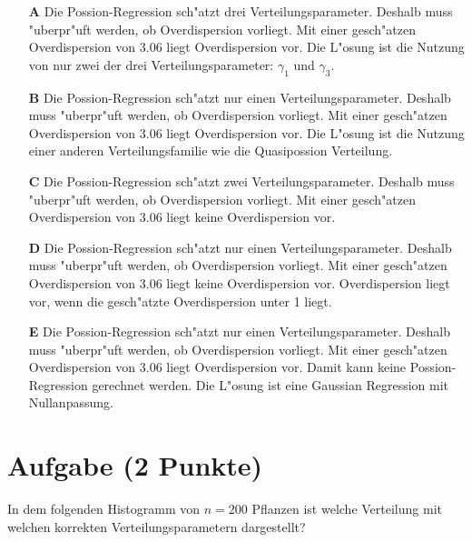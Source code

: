 \documentclass[a4paper, 10pt]{scrartcl}\usepackage[]{graphicx}\usepackage[]{color}
\begin{document}
\begin{enumerate}
\item [\textbf{A} \msquare] Die Possion-Regression sch{"a}tzt drei Verteilungsparameter. Deshalb muss {"u}berpr{"u}ft werden, ob Overdispersion vorliegt. Mit einer gesch{"a}tzen Overdispersion von 3.06 liegt Overdispersion vor. Die L{"o}sung ist die Nutzung von nur zwei der drei Verteilungsparameter: $\gamma_1$ und $\gamma_3$.
\item [\textbf{B} \msquare] Die Possion-Regression sch{"a}tzt nur einen Verteilungsparameter. Deshalb muss {"u}berpr{"u}ft werden, ob Overdispersion vorliegt. Mit einer gesch{"a}tzen Overdispersion von 3.06 liegt Overdispersion vor. Die L{"o}sung ist die Nutzung einer anderen Verteilungsfamilie wie die Quasipossion Verteilung.
\item [\textbf{C} \msquare] Die Possion-Regression sch{"a}tzt zwei Verteilungsparameter. Deshalb muss {"u}berpr{"u}ft werden, ob Overdispersion vorliegt. Mit einer gesch{"a}tzen Overdispersion von 3.06 liegt keine Overdispersion vor.
\item [\textbf{D} \msquare] Die Possion-Regression sch{"a}tzt nur einen Verteilungsparameter. Deshalb muss {"u}berpr{"u}ft werden, ob Overdispersion vorliegt. Mit einer gesch{"a}tzen Overdispersion von 3.06 liegt keine Overdispersion vor. Overdispersion liegt vor, wenn die gesch{"a}tzte Overdispersion unter 1 liegt.
\item [\textbf{E} \msquare] Die Possion-Regression sch{"a}tzt nur einen Verteilungsparameter. Deshalb muss {"u}berpr{"u}ft werden, ob Overdispersion vorliegt. Mit einer gesch{"a}tzen Overdispersion von 3.06 liegt Overdispersion vor. Damit kann keine Possion-Regression gerechnet werden. Die L{"o}sung ist eine Gaussian Regression mit Nullanpassung.
\end{enumerate}

\section{Aufgabe \hfill (2 Punkte)}

In dem folgenden Histogramm von $n = 200$ Pflanzen ist welche Verteilung
mit welchen korrekten Verteilungsparametern dargestellt?
\end{document}
